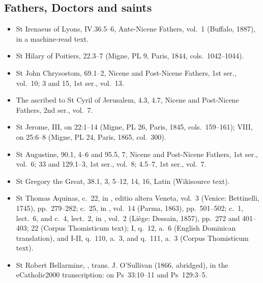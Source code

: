 {\subsection*{Fathers, Doctors and saints}
\begin{itemize}[itemsep=0pt,topsep=.2em]
\item St Irenaeus of Lyons,  IV.36.5--6, Ante-Nicene Fathers, vol.~1 (Buffalo, 1887), in a machine-read text.
\item St Hilary of Poitiers,  22.3--7 (Migne, PL 9, Paris, 1844, cols.~1042--1044).
\item St John Chrysostom,  69.1--2, Nicene and Post-Nicene Fathers, 1st ser., vol.~10;  3 and  15, 1st ser., vol.~13.
\item The  ascribed to St Cyril of Jerusalem, 4.3, 4.7, Nicene and Post-Nicene Fathers, 2nd ser., vol.~7.
\item St Jerome,  III, on 22:1--14 (Migne, PL 26, Paris, 1845, cols.~159--161);  VIII, on 25:6--8 (Migne, PL 24, Paris, 1865, col.~300).
\item St Augustine,  90.1, 4--6 and 95.5, 7, Nicene and Post-Nicene Fathers, 1st ser., vol.~6;  33 and 129.1--3, 1st ser., vol.~8;  4.5--7, 1st ser., vol.~7.
\item St Gregory the Great,  38.1, 3, 5--12, 14, 16, Latin (Wikisource text).
\item St Thomas Aquinas,  c.~22, in , editio altera Veneta, vol.~3 (Venice: Bettinelli, 1745), pp.~279--282;  c.~25, in , vol.~14 (Parma, 1863), pp.~501--502;  c.~1, lect.~6, and  c.~4, lect.~2, in , vol.~2 (Li\`ege: Dessain, 1857), pp.~272 and 401--403;  22 (Corpus Thomisticum text);  I, q.~12, a.~6 (English Dominican translation), and I-II, q.~110, a.~3, and q.~111, a.~3 (Corpus Thomisticum text).
\item St Robert Bellarmine, , trans. J. O'Sullivan (1866, abridged), in the eCatholic2000 transcription: on Ps~33:10--11 and Ps~129:3--5.
\end{itemize}

}

